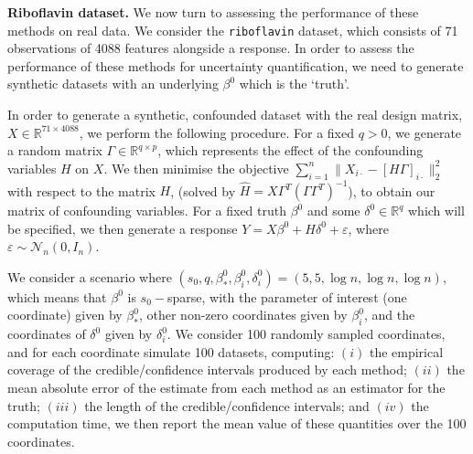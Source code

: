 \documentclass[11pt]{article}
\newcommand{\subparspacenonewline}{\vspace{3mm}}
\newcommand{\eps}{\varepsilon}
\newcommand{\R}{\mathbb{R}}
\newcommand{\N}{\mathcal{N}}
\begin{document}
\subparspacenonewline
{\bf Riboflavin dataset.}
We now turn to assessing the performance of these methods on real data. We consider the \texttt{riboflavin} dataset, which consists of 71 observations of 4088 features alongside a response. In order to assess the performance of these methods for uncertainty quantification, we need to generate synthetic datasets with an underlying $\beta^0$ which is the `truth'. 

In order to generate a synthetic, confounded dataset with the real design matrix, $X \in \R^{71 \times 4088}$, we perform the following procedure. For a fixed $q > 0$, we generate a random matrix $\Gamma \in \R^{q \times p}$, which represents the effect of the confounding variables $H$ on $X$. We then minimise the objective $\sum_{i = 1}^n \|X_{i\cdot} - [H\Gamma]_{i\cdot}\|_2^2$ with respect to the matrix $H$, (solved by $\hat{H} = X  \Gamma^T  (\Gamma  \Gamma^T)^{-1}$), to obtain our matrix of confounding variables. For a fixed truth $\beta^0$ and some $\delta^0 \in \R^q$ which will be specified, we then generate a response $Y = X\beta^0 + H\delta^0 + \eps$, where $\eps \sim \N_n(0, I_n)$. 

We consider a scenario where $(s_0, q, \beta^0_*, \beta_i^0, \delta_i^0) = (5, 5, \log n, \log n, \log n)$, which means that $\beta^0$ is $s_0-$sparse, with the parameter of interest (one coordinate) given by $\beta_*^0$, other non-zero coordinates given by $\beta_i^0$, and the coordinates of $\delta^0$ given by $\delta_i^0$. We consider 100 randomly sampled coordinates, and for each coordinate simulate 100 datasets, computing: $(i)$ the empirical coverage of the credible/confidence intervals produced by each method; $(ii)$ the mean absolute error of the estimate from each method as an estimator for the truth; $(iii)$ the length of the credible/confidence intervals; and $(iv)$ the computation time, we then report the mean value of these quantities over the 100 coordinates.
\end{document}
